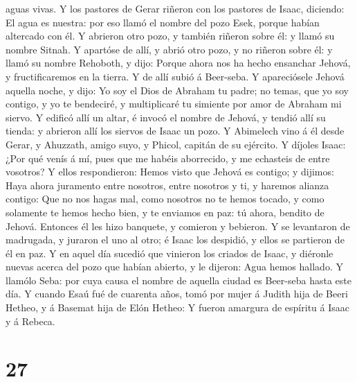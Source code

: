 aguas vivas.  Y los pastores de Gerar riñeron con los
pastores de Isaac, diciendo: El agua es nuestra: por eso llamó el nombre
del pozo Esek, porque habían altercado con él.  Y abrieron
otro pozo, y también riñeron sobre él: y llamó su nombre Sitnah.
 Y apartóse de allí, y abrió otro pozo, y no riñeron sobre
él: y llamó su nombre Rehoboth, y dijo: Porque ahora nos ha hecho
ensanchar Jehová, y fructificaremos en la tierra.  Y de
allí subió á Beer-seba.  Y apareciósele Jehová aquella
noche, y dijo: Yo soy el Dios de Abraham tu padre; no temas, que yo soy
contigo, y yo te bendeciré, y multiplicaré tu simiente por amor de
Abraham mi siervo.  Y edificó allí un altar, é invocó el
nombre de Jehová, y tendió allí su tienda: y abrieron allí los siervos
de Isaac un pozo.  Y Abimelech vino á él desde Gerar, y
Ahuzzath, amigo suyo, y Phicol, capitán de su ejército.  Y
díjoles Isaac: ¿Por qué venís á mí, pues que me habéis aborrecido, y me
echasteis de entre vosotros?  Y ellos respondieron: Hemos
visto que Jehová es contigo; y dijimos: Haya ahora juramento entre
nosotros, entre nosotros y ti, y haremos alianza contigo: 
Que no nos hagas mal, como nosotros no te hemos tocado, y como solamente
te hemos hecho bien, y te enviamos en paz: tú ahora, bendito de Jehová.
 Entonces él les hizo banquete, y comieron y bebieron.
 Y se levantaron de madrugada, y juraron el uno al otro; é
Isaac los despidió, y ellos se partieron de él en paz.  Y
en aquel día sucedió que vinieron los criados de Isaac, y diéronle
nuevas acerca del pozo que habían abierto, y le dijeron: Agua hemos
hallado.  Y llamólo Seba: por cuya causa el nombre de
aquella ciudad es Beer-seba hasta este día.  Y cuando Esaú
fué de cuarenta años, tomó por mujer á Judith hija de Beeri Hetheo, y á
Basemat hija de Elón Hetheo:  Y fueron amargura de espíritu
á Isaac y á Rebeca.

\hypertarget{section-26}{%
\section{27}\label{section-26}}

